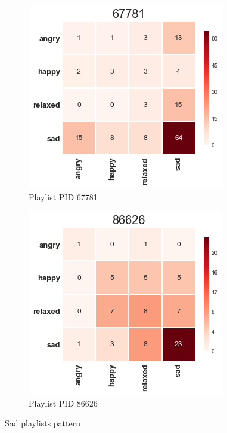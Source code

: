 \begin{figure}[H]
  \centering
  \begin{subfigure}[b]{0.49\linewidth}
    \includegraphics[width=\linewidth]{./chapters/chapter5/images/67781.png}
    \caption{Playlist PID 67781}
  \end{subfigure}
  \begin{subfigure}[b]{0.49\linewidth}
   \includegraphics[width=\linewidth]{./chapters/chapter5/images/86626.png}
    \caption{Playlist PID 86626}
  \end{subfigure}
  \caption{Sad playlists pattern}
  \label{fig:ann}
\end{figure}











